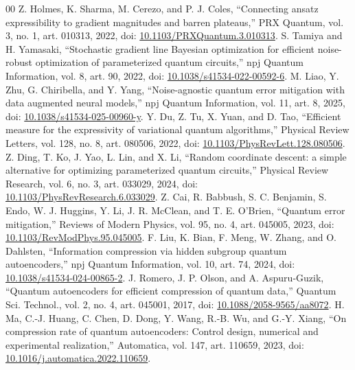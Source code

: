 \documentclass[conference]{IEEEtran}
\begin{document}
\begin{thebibliography}{00}
 Z. Holmes, K. Sharma, M. Cerezo, and P. J. Coles, ``Connecting ansatz expressibility to gradient magnitudes and barren plateaus,'' PRX Quantum, vol. 3, no. 1, art. 010313, 2022, doi: \href{https://doi.org/10.1103/PRXQuantum.3.010313}{10.1103/PRXQuantum.3.010313}.
 S. Tamiya and H. Yamasaki, ``Stochastic gradient line Bayesian optimization for efficient noise-robust optimization of parameterized quantum circuits,'' npj Quantum Information, vol. 8, art. 90, 2022, doi: \href{https://doi.org/10.1038/s41534-022-00592-6}{10.1038/s41534-022-00592-6}.
 M. Liao, Y. Zhu, G. Chiribella, and Y. Yang, ``Noise-agnostic quantum error mitigation with data augmented neural models,'' npj Quantum Information, vol. 11, art. 8, 2025, doi: \href{https://doi.org/10.1038/s41534-025-00960-y}{10.1038/s41534-025-00960-y}.
 Y. Du, Z. Tu, X. Yuan, and D. Tao, ``Efficient measure for the expressivity of variational quantum algorithms,'' Physical Review Letters, vol. 128, no. 8, art. 080506, 2022, doi: \href{https://doi.org/10.1103/PhysRevLett.128.080506}{10.1103/PhysRevLett.128.080506}.
 Z. Ding, T. Ko, J. Yao, L. Lin, and X. Li, ``Random coordinate descent: a simple alternative for optimizing parameterized quantum circuits,'' Physical Review Research, vol. 6, no. 3, art. 033029, 2024, doi: \href{https://doi.org/10.1103/PhysRevResearch.6.033029}{10.1103/PhysRevResearch.6.033029}.
 Z. Cai, R. Babbush, S. C. Benjamin, S. Endo, W. J. Huggins, Y. Li, J. R. McClean, and T. E. O'Brien, ``Quantum error mitigation,'' Reviews of Modern Physics, vol. 95, no. 4, art. 045005, 2023, doi: \href{https://doi.org/10.1103/RevModPhys.95.045005}{10.1103/RevModPhys.95.045005}.
 F. Liu, K. Bian, F. Meng, W. Zhang, and O. Dahlsten, ``Information compression via hidden subgroup quantum autoencoders,'' npj Quantum Information, vol. 10, art. 74, 2024, doi: \href{https://doi.org/10.1038/s41534-024-00865-2}{10.1038/s41534-024-00865-2}.
 J. Romero, J. P. Olson, and A. Aspuru-Guzik, ``Quantum autoencoders for efficient compression of quantum data,'' Quantum Sci. Technol., vol. 2, no. 4, art. 045001, 2017, doi: \href{https://doi.org/10.1088/2058-9565/aa8072}{10.1088/2058-9565/aa8072}.
 H. Ma, C.-J. Huang, C. Chen, D. Dong, Y. Wang, R.-B. Wu, and G.-Y. Xiang, ``On compression rate of quantum autoencoders: Control design, numerical and experimental realization,'' Automatica, vol. 147, art. 110659, 2023, doi: \href{https://doi.org/10.1016/j.automatica.2022.110659}{10.1016/j.automatica.2022.110659}.

\end{thebibliography}
\end{document}
